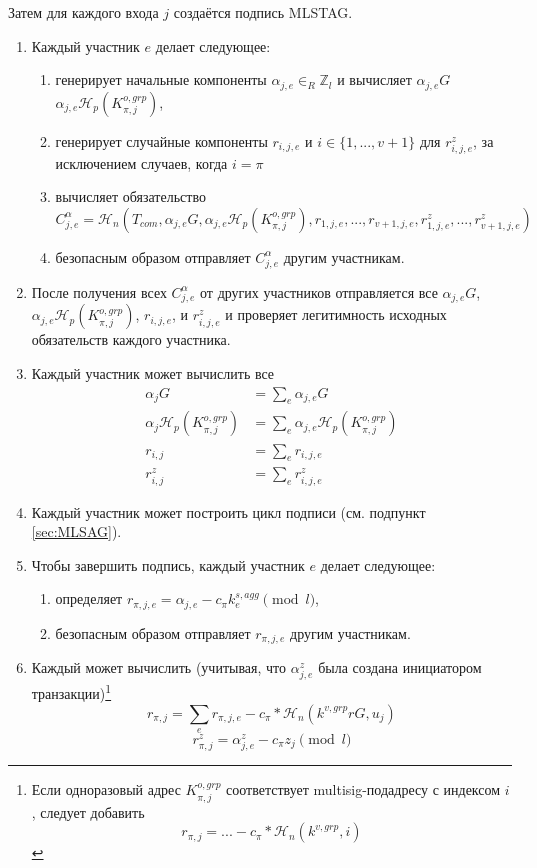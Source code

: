 Затем для каждого входа $j$ создаётся подпись MLSTAG.
\begin{enumerate}
    \item Каждый участник $e$ делает следующее:
    \begin{enumerate}
        \item генерирует начальные компоненты $\alpha_{j,e} \in_R \mathbb{Z}_l$ и вычисляет $\alpha_{j,e} G$  $\alpha_{j,e} \mathcal{H}_p(K^{o,grp}_{\pi,j})$,
        \item генерирует случайные компоненты $r_{i,j,e}$ и $i \in \{1,...,v+1\}$ для $r^z_{i,j,e}$, за исключением случаев, когда $i = \pi$
        \item вычисляет обязательство
        \[C^{\alpha}_{j,e} = \mathcal{H}_n(T_{com},\alpha_{j,e} G, \alpha_{j,e} \mathcal{H}_p(K^{o,grp}_{\pi,j}),r_{1,j,e},...,r_{v+1,j,e},r^z_{1,j,e},...,r^z_{v+1,j,e})\]
        \item безопасным образом отправляет $C^{\alpha}_{j,e}$ другим участникам.
    \end{enumerate}
    \item После получения всех $C^{\alpha}_{j,e}$ от других участников отправляется все $\alpha_{j,e} G$, $\alpha_{j,e} \mathcal{H}_p(K^{o,grp}_{\pi,j})$, $r_{i,j,e}$, и $r^z_{i,j,e}$ и проверяет легитимность исходных обязательств каждого участника.
    \item Каждый участник может вычислить все
    \begin{align*}
        \alpha_{j} G &= \sum_e \alpha_{j,e} G\\
        \alpha_{j} \mathcal{H}_p(K^{o,grp}_{\pi,j}) &= \sum_e \alpha_{j,e} \mathcal{H}_p(K^{o,grp}_{\pi,j})\\
        r_{i,j} &= \sum_e r_{i,j,e}\\
        r^{z}_{i,j} &= \sum_e r^z_{i,j,e}
    \end{align*}{}
    \item Каждый участник может построить цикл подписи (см. подпункт \ref{sec:MLSAG}).
    \item Чтобы завершить подпись, каждый участник $e$ делает следующее:
    \begin{enumerate}
        \item определяет $r_{\pi,j,e} = \alpha_{j,e} - c_{\pi} k^{s,agg}_e \pmod l$,
        \item безопасным образом отправляет $r_{\pi,j,e}$ другим участникам.
    \end{enumerate}
    \item Каждый может вычислить (учитывая, что $\alpha^z_{j,e}$ была создана инициатором транзакции)\footnote{Если одноразовый адрес $K^{o,grp}_{\pi,j}$ соответствует multisig-подадресу с индексом $i$, следует добавить
    \[r_{\pi,j} = ... - c_{\pi}*\mathcal{H}_n(k^{v,grp},i)\]}\vspace{.175cm}
    \[r_{\pi,j} = \sum_e r_{\pi,j,e} - c_{\pi}*\mathcal{H}_n(k^{v,grp} r G, u_j)\]
    \[r^{z}_{\pi,j} = \alpha^z_{j,e} - c_{\pi} z_j \pmod l\]
\end{enumerate}

